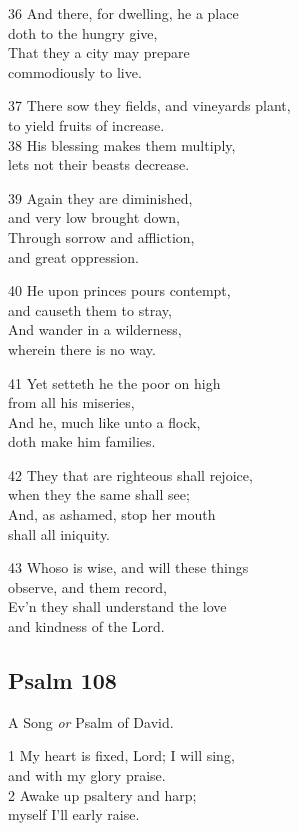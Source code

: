 36 And there, for dwelling, he a place\\
doth to the hungry give,\\
That they a city may prepare\\
commodiously to live.

37 There sow they fields, and vineyards plant,\\
to yield fruits of increase.\\
38 His blessing makes them multiply,\\
lets not their beasts decrease.

39 Again they are diminished,\\
and very low brought down,\\
Through sorrow and affliction,\\
and great oppression.

40 He upon princes pours contempt,\\
and causeth them to stray,\\
And wander in a wilderness,\\
wherein there is no way.

41 Yet setteth he the poor on high\\
from all his miseries,\\
And he, much like unto a flock,\\
doth make him families.

42 They that are righteous shall rejoice,\\
when they the same shall see;\\
And, as ashamed, stop her mouth\\
shall all iniquity.

43 Whoso is wise, and will these things\\
observe, and them record,\\
Ev’n they shall understand the love\\
and kindness of the Lord.

\begin{center}
\quad{}\quad{}
\end{center}


\subsection*{Psalm 108}

A Song \emph{or} Psalm of David.

1 My heart is fixed, Lord; I will sing,\\
and with my glory praise.\\
2 Awake up psaltery and harp;\\
myself I’ll early raise.

